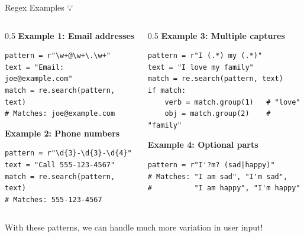 \documentclass[aspectratio=169]{beamer}
\begin{document}
\begin{frame}[fragile]{Regex Examples 💡}
\begin{columns}
\begin{column}{0.5\textwidth}
\textbf{Example 1: Email addresses}
\begin{lstlisting}[basicstyle=\ttfamily\tiny]
pattern = r"\w+@\w+\.\w+"
text = "Email: joe@example.com"
match = re.search(pattern, text)
# Matches: joe@example.com
\end{lstlisting}

\vspace{0.15cm}

\textbf{Example 2: Phone numbers}
\begin{lstlisting}[basicstyle=\ttfamily\tiny]
pattern = r"\d{3}-\d{3}-\d{4}"
text = "Call 555-123-4567"
match = re.search(pattern, text)
# Matches: 555-123-4567
\end{lstlisting}
\end{column}

\begin{column}{0.5\textwidth}
\textbf{Example 3: Multiple captures}
\begin{lstlisting}[basicstyle=\ttfamily\tiny]
pattern = r"I (.*) my (.*)"
text = "I love my family"
match = re.search(pattern, text)
if match:
    verb = match.group(1)   # "love"
    obj = match.group(2)    # "family"
\end{lstlisting}

\vspace{0.15cm}

\textbf{Example 4: Optional parts}
\begin{lstlisting}[basicstyle=\ttfamily\tiny]
pattern = r"I'?m? (sad|happy)"
# Matches: "I am sad", "I'm sad",
#          "I am happy", "I'm happy"
\end{lstlisting}
\end{column}
\end{columns}

\vspace{0.3cm}

\begin{thinkaboutit}
With these patterns, we can handle much more variation in user input!
\end{thinkaboutit}
\end{frame}
\end{document}
